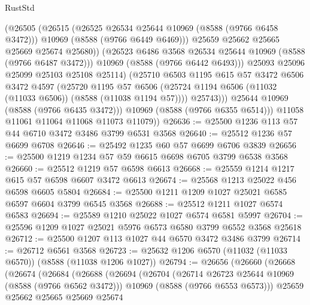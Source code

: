 \begin{lexlean}{RustStd}
\begin{coremodule}
                      (@26505
                        (@26515
                          (@26525 @26534 @25644 @10969 (@8588 (@9766 @6458 @3472)))
                          @10969
                          (@8588 (@9766 @6449 @6469)))
                        @25659
                        @25662
                        @25665
                        @25669
                        @25674
                        @25680))
                    (@26523 @6486 @3568 @26534 @25644 @10969 (@8588 (@9766 @6487 @3472)))
                    @10969
                    (@8588 (@9766 @6442 @6493)))
                  @25093
                  @25096
                  @25099
                  @25103
                  @25108
                  @25114)
                (@25710
                  @6503
                  @1195
                  @615
                  @57
                  @3472
                  @6506
                  @3472
                  @4597
                  (@25720
                    @1195
                    @57
                    @6506
                    (@25724 @1194 @6506 (@11032 (@11033 @6506)) (@8588 (@11038 @1194 @57))))
                  @25743)))
            @25644
            @10969
            (@8588 (@9766 @6435 @3472)))
          @10969
          (@8588 (@9766 @6355 @6514)))
        @11058
        @11061
        @11064
        @11068
        @11073
        @11079))
@26636 := @25500 @1236 @113 @57 @44 @6710 @3472 @3486 @3799 @6531 @3568
@26640 := @25512 @1236 @57 @6699 @6708
@26646 := @25492 @1235 @60 @57 @6699 @6706 @3839
@26656 := @25500 @1219 @1234 @57 @59 @6615 @6698 @6705 @3799 @6538 @3568
@26660 := @25512 @1219 @57 @6598 @6613
@26668 := @25559 @1214 @1217 @615 @57 @6598 @6607 @3472 @6613
@26674 := @25568 @1213 @25022 @456 @6598 @6605 @5804
@26684 := @25500 @1211 @1209 @1027 @25021 @6585 @6597 @6604 @3799 @6545 @3568
@26688 := @25512 @1211 @1027 @6574 @6583
@26694 := @25589 @1210 @25022 @1027 @6574 @6581 @5997
@26704 := @25596 @1209 @1027 @25021 @5976 @6573 @6580 @3799 @6552 @3568 @25618
@26712 := @25500 @1207 @113 @1027 @44 @6570 @3472 @3486 @3799
@26714 := @26712 @6561 @3568
@26723 := @25632 @1206 @6570 (@11032 (@11033 @6570)) (@8588 (@11038 @1206 @1027))
@26794 := @26656
    (@26660
      (@26668
        (@26674
          (@26684
            (@26688
              (@26694
                (@26704
                  (@26714 @26723 @25644 @10969 (@8588 (@9766 @6562 @3472)))
                  @10969
                  (@8588 (@9766 @6553 @6573)))
                @25659
                @25662
                @25665
                @25669
                @25674

\end{coremodule}
\end{lexlean}
